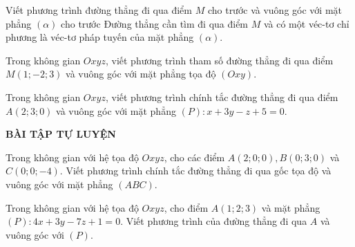 \begin{dang}{Viết phương trình đường thẳng đi qua điểm $M$ cho trước và vuông góc với mặt phẳng $(\alpha)$ cho trước}
	Đường thẳng cần tìm đi qua điểm $M$ và có một véc-tơ chỉ phương là véc-tơ pháp tuyến của mặt phẳng $(\alpha)$.
\end{dang}
\begin{vd}%
	Trong không gian $Oxyz$, viết phương trình tham số đường thẳng đi qua điểm $M(1;-2;3)$ và vuông góc với mặt phẳng tọa độ $(Oxy)$.
\end{vd}
\begin{vd}%
	Trong không gian $Oxyz$, viết phương trình chính tắc đường thẳng đi qua điểm $A(2;3;0)$ và vuông góc với mặt phẳng $(P): x + 3y - z + 5 = 0.$
		\end{vd}
	\begin{center}
\textbf{BÀI TẬP TỰ LUYỆN}
\end{center}
	\begin{bt}%
		Trong không gian với hệ tọa độ $Oxyz$, cho các điểm $A\left(2;0;0\right), B\left(0;3;0\right)$ và $C\left(0;0;-4\right)$. Viết phương trình chính tắc đường thẳng đi qua gốc tọa độ và vuông góc với mặt phẳng $(ABC)$.
				\end{bt}
\begin{bt}%
Trong không gian với hệ tọa độ $Oxyz$, cho điểm $A\left(1;2;3\right)$ và mặt phẳng $(P):4x+3y-7z+1=0$. Viết  phương trình của đường thẳng đi qua $A$ và vuông góc với $(P)$.
\end{bt}
